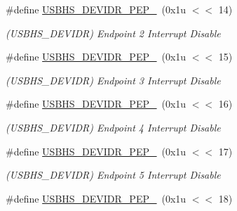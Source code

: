 \begin{DoxyCompactItemize}
\mbox{\label{group__SAMS70__USBHS_gade1490357edec0e625b63ce3394b84a5}} 
\#define \mbox{\hyperlink{group__SAMS70__USBHS_gade1490357edec0e625b63ce3394b84a5}{U\+S\+B\+H\+S\+\_\+\+D\+E\+V\+I\+D\+R\+\_\+\+P\+E\+P\+\_}}~(0x1u $<$$<$ 14)
\begin{DoxyCompactList}\small\item\em (U\+S\+B\+H\+S\+\_\+\+D\+E\+V\+I\+DR) Endpoint 2 Interrupt Disable \end{DoxyCompactList}\item 
\mbox{\label{group__SAMS70__USBHS_ga2a74174e1a0ef142393f6185ddd6154d}} 
\#define \mbox{\hyperlink{group__SAMS70__USBHS_ga2a74174e1a0ef142393f6185ddd6154d}{U\+S\+B\+H\+S\+\_\+\+D\+E\+V\+I\+D\+R\+\_\+\+P\+E\+P\+\_}}~(0x1u $<$$<$ 15)
\begin{DoxyCompactList}\small\item\em (U\+S\+B\+H\+S\+\_\+\+D\+E\+V\+I\+DR) Endpoint 3 Interrupt Disable \end{DoxyCompactList}\item 
\mbox{\label{group__SAMS70__USBHS_gac0c4d5faf32123d5991bcc666405b3ac}} 
\#define \mbox{\hyperlink{group__SAMS70__USBHS_gac0c4d5faf32123d5991bcc666405b3ac}{U\+S\+B\+H\+S\+\_\+\+D\+E\+V\+I\+D\+R\+\_\+\+P\+E\+P\+\_}}~(0x1u $<$$<$ 16)
\begin{DoxyCompactList}\small\item\em (U\+S\+B\+H\+S\+\_\+\+D\+E\+V\+I\+DR) Endpoint 4 Interrupt Disable \end{DoxyCompactList}\item 
\mbox{\label{group__SAMS70__USBHS_ga42b3d46dd0360b7b04e8b9720e20e0d3}} 
\#define \mbox{\hyperlink{group__SAMS70__USBHS_ga42b3d46dd0360b7b04e8b9720e20e0d3}{U\+S\+B\+H\+S\+\_\+\+D\+E\+V\+I\+D\+R\+\_\+\+P\+E\+P\+\_}}~(0x1u $<$$<$ 17)
\begin{DoxyCompactList}\small\item\em (U\+S\+B\+H\+S\+\_\+\+D\+E\+V\+I\+DR) Endpoint 5 Interrupt Disable \end{DoxyCompactList}\item 
\mbox{\label{group__SAMS70__USBHS_ga912ad39def28280cdca92ee560903840}} 
\#define \mbox{\hyperlink{group__SAMS70__USBHS_ga912ad39def28280cdca92ee560903840}{U\+S\+B\+H\+S\+\_\+\+D\+E\+V\+I\+D\+R\+\_\+\+P\+E\+P\+\_}}~(0x1u $<$$<$ 18)
$$
\end{DoxyCompactItemize}
